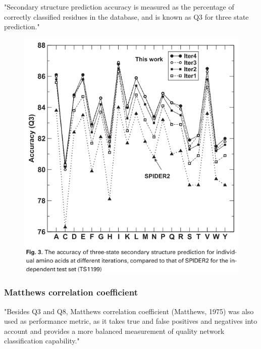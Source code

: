 \documentclass[]{scrartcl}
\begin{document}
"Secondary structure prediction accuracy is measured as the percentage of correctly classified residues in the database, and is known as Q3 for three state prediction." \cite{Heffernan2017}
\begin{figure}[h]
	\centering
	\includegraphics[width=0.7\linewidth]{peramino}
\end{figure}
\subsubsection{Matthews correlation coefficient}
"Besides Q3 and Q8, Matthews correlation coefficient (Matthews, 1975) was also used as performance metric, as it takes true and false positives and negatives into account and provides a more balanced measurement of quality network classification capability." \cite{Fang2017}
\end{document}
